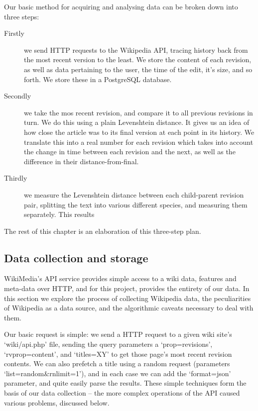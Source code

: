 Our basic method for acquiring and analysing data can be broken down
into three steps:

\begin{description}
\item[Firstly] we send HTTP requests to the Wikipedia API, tracing
  history back from the most recent version to the least. We store the
  content of each revision, as well as data pertaining to the user,
  the time of the edit, it's size, and so forth. We store these in a
  PostgreSQL database.
\item[Secondly] we take the mos recent revision, and compare it to all
  previous revisions in turn. We do this using a plain Levenshtein
  distance. It gives us an idea of how close the article was to its
  final version at each point in its history. We translate this into a
  real number for each revision which takes into account the change in
  time between each revision and the next, as well as the difference
  in their distance-from-final.
\item[Thirdly] we measure the Levenshtein distance between each
  child-parent revision pair, splitting the text into various
  different species, and measuring them separately. This results
\end{description}

The rest of this chapter is an elaboration of this three-step plan.

\subsection*{Data collection and storage}
\label{sec:wiki-api}
WikiMedia's API service provides simple access to a wiki data,
features and meta-data over HTTP,\cite{wiki-api} and for this project,
provides the entirety of our data. In this section we explore the
process of collecting Wikipedia data, the peculiarities of Wikipedia
as a data source, and the algorithmic caveats necessary to deal with
them.

Our basic request is simple: we send a HTTP request to a given wiki
site's `wiki/api.php' file, sending the query parameters a
`prop=revisions', `rvprop=content', and `titles=X{\textbar}Y' to get those
page's most recent revision contents. We can also prefetch a title
using a random request (parameters `list=random\&rnlimit=1'), and in
each case we can add the `format=json' parameter, and quite easily
parse the results. These simple techniques form the basis of our data
collection -- the more complex operations of the API caused various
problems, discussed below.

